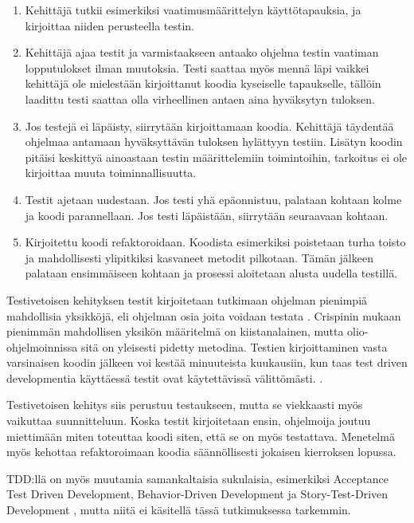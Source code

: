 \documentclass[finnish]{tktltiki2}
\theoremstyle{definition}
\theoremstyle{remark}
\begin{document}
\begin{enumerate}

  \item Kehittäjä tutkii esimerkiksi vaatimusmäärittelyn käyttötapauksia, ja kirjoittaa niiden perusteella testin.

  \item Kehittäjä ajaa testit ja varmistaakseen antaako ohjelma testin vaatiman lopputulokset ilman muutoksia. Testi saattaa myös mennä läpi vaikkei kehittäjä ole mielestään kirjoittanut koodia kyseiselle tapaukselle, tällöin laadittu testi saattaa olla virheellinen antaen aina hyväksytyn tuloksen.

  \item Jos testejä ei läpäisty, siirrytään kirjoittamaan koodia. Kehittäjä täydentää ohjelmaa antamaan hyväksyttävän tuloksen hylättyyn testiin. Lisätyn koodin pitäisi keskittyä ainoastaan testin määrittelemiin toimintoihin, tarkoitus ei ole kirjoittaa muuta toiminnallisuutta.

 \item Testit ajetaan uudestaan. Jos testi yhä epäonnistuu, palataan kohtaan kolme ja koodi parannellaan. Jos testi läpäistään, siirrytään seuraavaan kohtaan.

 \item Kirjoitettu koodi refaktoroidaan. Koodista esimerkiksi poistetaan turha toisto ja mahdollisesti ylipitkiksi kasvaneet metodit pilkotaan. Tämän jälkeen palataan ensimmäiseen kohtaan ja prosessi aloitetaan alusta uudella testillä.

\end{enumerate}

Testivetoisen kehityksen testit kirjoitetaan tutkimaan ohjelman pienimpiä mahdollisia yksikköjä, eli ohjelman osia joita voidaan testata \cite{Crispin06}. Crispinin mukaan pienimmän mahdollisen yksikön määritelmä on kiistanalainen, mutta olio-ohjelmoinnissa sitä on yleisesti pidetty metodina. Testien kirjoittaminen vasta varsinaisen koodin jälkeen voi kestää minuuteista kuukausiin, kun taas test driven developmentia käyttäessä testit ovat käytettävissä välittömästi. \cite{Janzen05}. 

Testivetoisen kehitys siis perustuu testaukseen, mutta se viekkaasti myös vaikuttaa suunnitteluun. Koska testit kirjoitetaan ensin, ohjelmoija joutuu miettimään miten toteuttaa koodi siten, että se on myös testattava. Menetelmä myös  kehottaa refaktoroimaan koodia säännöllisesti jokaisen kierroksen lopussa.

TDD:llä on myös muutamia samankaltaisia sukulaisia, esimerkiksi 
Acceptance Test Driven Development, Behavior-Driven Development ja Story-Test-Driven Development \cite{Turhan10}, mutta niitä ei käsitellä tässä tutkimuksessa tarkemmin.
\end{document}

